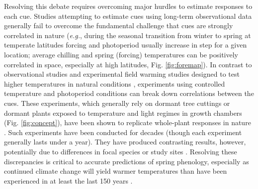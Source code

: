 \documentclass{article}
\newcommand{\R}[1]{\label{#1}\linelabel{#1}}
\begin{document}
\par Resolving this debate requires overcoming major hurdles to estimate responses to each cue. Studies attempting to estimate cues using long-term observational data \emph{\citep[e.g.,][]{zohner2016,vitasse2013}} generally fail to overcome the fundamental challenge that cues are strongly correlated in nature (\emph{e.g.}, during the seasonal transition from winter to spring at temperate latitudes forcing and photoperiod usually increase in step for a given location; average chilling and spring (forcing) temperatures can be positively correlated in space, especially at high latitudes, Fig. \ref{fig:foremap}). In contrast to observational studies and experimental field warming studies designed to test higher temperatures in natural conditions \emph{\citep{Wolkovich:2012n}},  \R{ee2start}experiments using controlled temperature and photoperiod conditions\R{ee2end} can break down correlations between the cues. These experiments, which generally rely on dormant tree cuttings or dormant plants exposed to temperature and light regimes in growth chambers (Fig. \ref{fig:concept}), have been shown to replicate whole-plant responses in nature \emph{\citep{vitasse2014}}. Such experiments have been conducted for decades (though each experiment generally lasts under a year). They have produced contrasting results, however, potentially due to differences in focal species or study sites \emph{\citep{zohner2016,Caffarra:2011b,Laube:2014a,Basler:2012,Caffarra:2011a}}. Resolving these discrepancies is critical to accurate predictions of spring phenology, especially as continued climate change will yield warmer temperatures than have been experienced in at least the last 150 years \emph{\citep{ohlemuller2006,williams2007,williams2007b,ipcc2013,xu2018}}.

\end{document}
